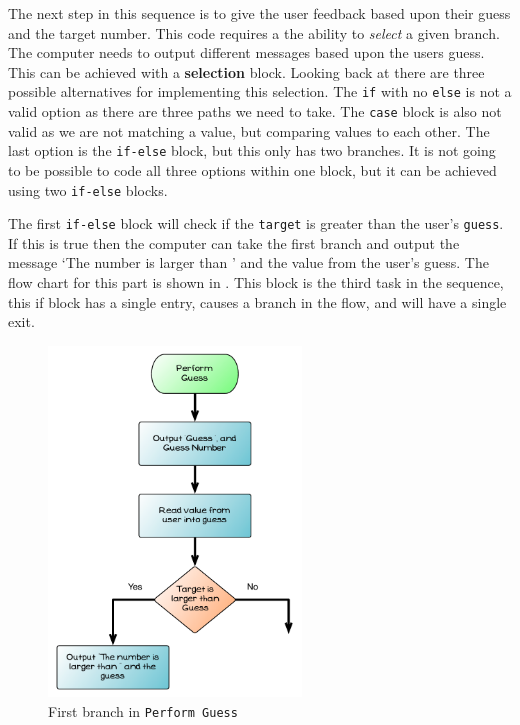 \clearpage
The next step in this sequence is to give the user feedback based upon their guess and the target number. This code requires a the ability to \emph{select} a given branch. The computer needs to output different messages based upon the users guess. This can be achieved with a \textbf{selection} block. Looking back at  there are three possible alternatives for implementing this selection. The \texttt{if} with no \texttt{else} is not a valid option as there are three paths we need to take. The \texttt{case} block is also not valid as we are not matching a value, but comparing values to each other. The last option is the \texttt{if-else} block, but this only has two branches. It is not going to be possible to code all three options within one block, but it can be achieved using two \texttt{if-else} blocks.

The first \texttt{if-else} block will check if the \texttt{target} is greater than the user's \texttt{guess}. If this is true then the computer can take the first branch and output the message `The number is larger than ' and the value from the user's guess. The flow chart for this part is shown in . This block is the third task in the sequence, this if block has a single entry, causes a branch in the flow, and will have a single exit.

\begin{figure}[h]
   \centering
   \includegraphics[width=0.6\textwidth]{./topics/control-flow/diagrams/PerformGuess2} 
   \caption{First branch in \texttt{Perform Guess}}
   \label{fig:perform-guess-2}
\end{figure}

